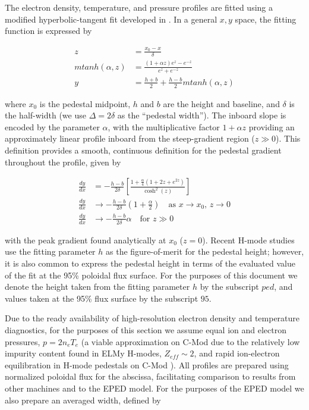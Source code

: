 The electron density, temperature, and pressure profiles are fitted using a modified hyperbolic-tangent fit developed in \cite{Groebner2001}.  In a general $x,y$ space, the fitting function is expressed by

\begin{equation}\label{eq:mtanh}
 \begin{aligned}
  z &= \frac{x_0 - x}{\delta}\\
  mtanh(\alpha,z) &= \frac{(1 + \alpha z) e^z - e^{-z}}{e^z + e^{-z}}\\
  y &= \frac{h+b}{2} + \frac{h-b}{2} mtanh(\alpha,z)
 \end{aligned}
\end{equation}

\noindent where $x_0$ is the pedestal midpoint, $h$ and $b$ are the height and baseline, and $\delta$ is the half-width (we use $\Delta = 2\delta$ as the ``pedestal width'').  The inboard slope is encoded by the parameter $\alpha$, with the multiplicative factor $1 + \alpha z$ providing an approximately linear profile inboard from the steep-gradient region ($z \gg 0$).  This definition provides a smooth, continuous definition for the pedestal gradient throughout the profile, given by

\begin{equation}\label{eq:mtanh_grad}
 \begin{aligned}
  \frac{dy}{dx} &= -\frac{h-b}{2\delta} \left[ \frac{1 + \frac{\alpha}{4}\left( 1 + 2z + e^{2z} \right)}{\cosh^2(z)}\right]\\
 \frac{dy}{dx} &\rightarrow -\frac{h-b}{2\delta}\left(1 + \frac{\alpha}{2}\right) \quad \mbox{as $x\rightarrow x_0$, $z \rightarrow 0$}\\
 \frac{dy}{dx} &\rightarrow -\frac{h-b}{2\delta}\alpha \quad \mbox{for $z \gg 0$}
 \end{aligned}
\end{equation}

\noindent with the peak gradient found analytically at $x_0$ ($z=0$).  Recent H-mode studies use the fitting parameter $h$ as the figure-of-merit for the pedestal height; however, it is also common to express the pedestal height in terms of the evaluated value of the fit at the 95\% poloidal flux surface.  For the purposes of this document we denote the height taken from the fitting parameter $h$ by the subscript $ped$, and values taken at the 95\% flux surface by the subscript $95$. 

Due to the ready availability of high-resolution electron density and temperature diagnostics, for the purposes of this section we assume equal ion and electron pressures, $p = 2n_e T_e$ (a viable approximation on C-Mod due to the relatively low impurity content found in ELMy H-modes, $Z_{eff} \sim 2$, and rapid ion-electron equilibration in H-mode pedestals on C-Mod \cite{McDermott2009a}).  All profiles are prepared using normalized poloidal flux for the abscissa, facilitating comparison to results from other machines and to the EPED model.  For the purposes of the EPED model we also prepare an averaged width, defined by

